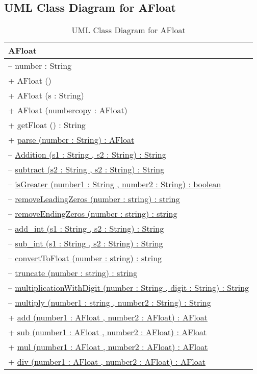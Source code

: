 \documentclass[a4paper,12pt]{article}
\begin{document}
\subsection{UML Class Diagram for AFloat}

\begin{table}[h!]
\centering
\begin{tabular}{|l|}
\hline
\textbf{AFloat}\\
\hline
-- number : String\\
\hline
+ AFloat () \\
+ AFloat (s : String) \\
+ AFloat (numbercopy : AFloat)\\
+ getFloat () : String \\
+ \underline{parse (number : String) : AFloat} \\
-- \underline{Addition (s1 : String , s2 : String) : String} \\
-- \underline{subtract (s2 : String , s2 : String) : String} \\
-- \underline{isGreater (number1 : String , number2 : String) : boolean }\\
-- \underline{removeLeadingZeros (number : string) : string} \\
-- \underline{removeEndingZeros (number : string) : string} \\
-- \underline{add\_int (s1 : String , s2 : String) : String} \\
-- \underline{sub\_int (s1 : String , s2 : String) : String} \\
-- \underline{convertToFloat (number : string) : string} \\
-- \underline{truncate (number : string) : string} \\
-- \underline{multiplicationWithDigit (number : String , digit : String) : String} \\
-- \underline{multiply (number1 : string , number2 : String) : String} \\
+ \underline{add (number1 : AFloat , number2 : AFloat) : AFloat} \\
+ \underline{sub (number1 : AFloat , number2 : AFloat) : AFloat} \\
+ \underline{mul (number1 : AFloat , number2 : AFloat) : AFloat} \\
+ \underline{div (number1 : AFloat , number2 : AFloat) : AFloat} \\
\hline
\end{tabular}
\caption{UML Class Diagram for AFloat}
\end{table}
\end{document}
